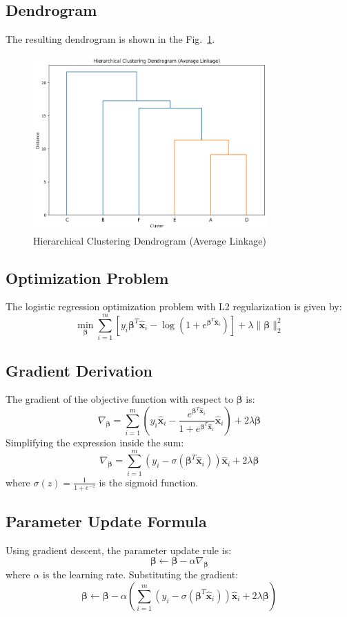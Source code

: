 \documentclass[oneside,solution]{seu-ml-assign}
\begin{document}
\subsection{Dendrogram}

The resulting dendrogram is shown in the Fig.~\ref{fig:dendrogram}.

\begin{figure}[h]
  \centering
  \includegraphics[width=0.8\textwidth]{dendrogram.png}
  \caption{Hierarchical Clustering Dendrogram (Average Linkage)}
  \label{fig:dendrogram}
\end{figure}



\subsection{Optimization Problem}
The logistic regression optimization problem with L2 regularization is given by:
\[
\min_{\bm{\beta}} \sum_{i=1}^{m} \left[ y_i \bm{\beta}^T \hat{\bm{x}}_i - \log{\left(1 + e^{\bm{\beta}^T \hat{\bm{x}}_i}\right)} \right] + \lambda \|\bm{\beta}\|^2_2
\]

\subsection{Gradient Derivation}
The gradient of the objective function with respect to \(\bm{\beta}\) is:
\[
\nabla_{\bm{\beta}} = \sum_{i=1}^{m} \left( y_i \hat{\bm{x}}_i - \frac{e^{\bm{\beta}^T \hat{\bm{x}}_i}}{1 + e^{\bm{\beta}^T \hat{\bm{x}}_i}} \hat{\bm{x}}_i \right) + 2 \lambda \bm{\beta}
\]
Simplifying the expression inside the sum:
\[
\nabla_{\bm{\beta}} = \sum_{i=1}^{m} \left( y_i - \sigma(\bm{\beta}^T \hat{\bm{x}}_i) \right) \hat{\bm{x}}_i + 2 \lambda \bm{\beta}
\]
where \(\sigma(z) = \frac{1}{1 + e^{-z}}\) is the sigmoid function.

\subsection{Parameter Update Formula}
Using gradient descent, the parameter update rule is:
\[
\bm{\beta} \leftarrow \bm{\beta} - \alpha \nabla_{\bm{\beta}}
\]
where \(\alpha\) is the learning rate. Substituting the gradient:
\[
\bm{\beta} \leftarrow \bm{\beta} - \alpha \left( \sum_{i=1}^{m} \left( y_i - \sigma(\bm{\beta}^T \hat{\bm{x}}_i) \right) \hat{\bm{x}}_i + 2 \lambda \bm{\beta} \right)
\]


\vspace{2mm}
\end{document}
